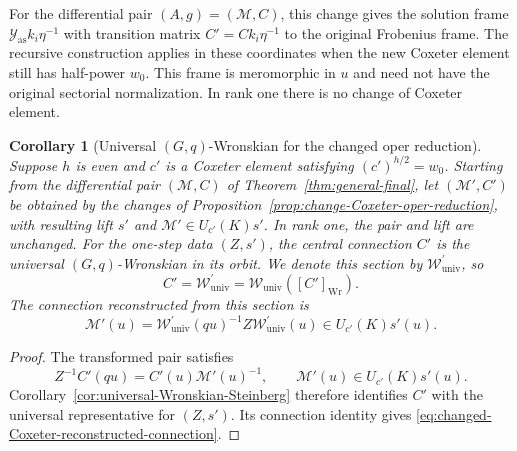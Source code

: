 \documentclass[11pt,leqno]{amsart}
\numberwithin{equation}{section}
\theoremstyle{plain}
\newtheorem{corollary}[theorem]{Corollary}
\theoremstyle{definition}
\theoremstyle{plain}
\theoremstyle{definition}
\theoremstyle{remark}
\begin{document}
For the differential pair $(A,g)=(\mathscr M,C)$, this change gives the solution frame $\mathcal Y_{\mathrm{as}}k_i\eta^{-1}$ with transition matrix $C'=Ck_i\eta^{-1}$ to the original Frobenius frame. The recursive construction applies in these coordinates when the new Coxeter element still has half-power $w_0$. This frame is meromorphic in $u$ and need not have the original sectorial normalization. In rank one there is no change of Coxeter element.

\begin{corollary}[Universal $(G,q)$-Wronskian for the changed oper reduction]\label{cor:changed-Coxeter-universal-Wronskian}
Suppose $h$ is even and $c'$ is a Coxeter element satisfying $(c')^{h/2}=w_0$. Starting from the differential pair $(\mathscr M,C)$ of Theorem~\ref{thm:general-final}, let $(\mathscr M',C')$ be obtained by the changes of Proposition~\ref{prop:change-Coxeter-oper-reduction}, with resulting lift $s'$ and $\mathscr M'\in U_{c'}(K)s'$. In rank one, the pair and lift are unchanged. For the one-step data $(Z,s')$, the central connection $C'$ is the universal $(G,q)$-Wronskian in its orbit. We denote this section by $\mathscr W_{\mathrm{univ}}^{\prime}$, so
\begin{equation}\label{eq:changed-Coxeter-universal-Wronskian}
 C'=\mathscr W_{\mathrm{univ}}^{\prime}
   =\mathscr W_{\mathrm{univ}}([C']_{\mathrm{Wr}}).
\end{equation}
The connection reconstructed from this section is
\begin{equation}\label{eq:changed-Coxeter-reconstructed-connection}
 \mathscr M'(u)
 =\mathscr W_{\mathrm{univ}}^{\prime}(qu)^{-1}
     Z\mathscr W_{\mathrm{univ}}^{\prime}(u)
 \in U_{c'}(K)s'(u).
\end{equation}
\end{corollary}
\begin{proof}
The transformed pair satisfies
\[
 Z^{-1}C'(qu)=C'(u)\mathscr M'(u)^{-1},
 \qquad \mathscr M'(u)\in U_{c'}(K)s'(u).
\]
Corollary~\ref{cor:universal-Wronskian-Steinberg} therefore identifies $C'$ with the universal representative for $(Z,s')$. Its connection identity gives \eqref{eq:changed-Coxeter-reconstructed-connection}.
\end{proof}

\appendix
{}
\end{document}
